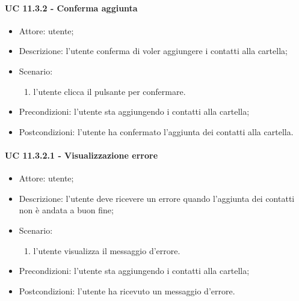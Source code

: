     \paragraph{UC 11.3.2 - Conferma aggiunta} \label{sec: UC 11.3.2}
    \begin{itemize}
        \item Attore: utente;
        \item Descrizione: l'utente conferma di voler aggiungere i contatti alla cartella;
        \item Scenario:
        \begin{enumerate}
        \item l'utente clicca il pulsante per confermare.
        \end{enumerate}
        \item Precondizioni: l'utente sta aggiungendo i contatti alla cartella;
        \item Postcondizioni: l'utente ha confermato l'aggiunta dei contatti alla cartella.
    \end{itemize}
    \paragraph{UC 11.3.2.1 - Visualizzazione errore} \label{sec: UC 11.3.2.1}
    \begin{itemize}
        \item Attore: utente;
        \item Descrizione: l'utente deve ricevere un errore quando l'aggiunta dei contatti non è andata a buon fine;
        \item Scenario:
        \begin{enumerate}
        \item l'utente visualizza il messaggio d'errore.
        \end{enumerate}   
        \item Precondizioni: l'utente sta aggiungendo i contatti alla cartella;
        \item Postcondizioni: l'utente ha ricevuto un messaggio d'errore.
    \end{itemize}
